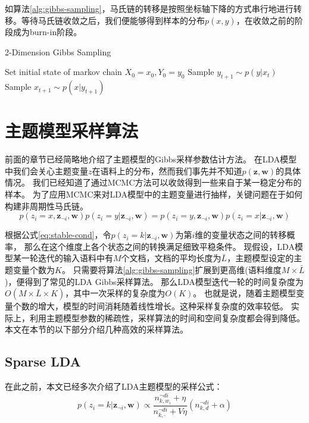 如算法\ref{alg:gibbs-sampling}，马氏链的转移是按照坐标轴下降的方式串行地进行转移。等待马氏链收敛之后，我们便能够得到样本的分布$p(x,y)$，在收敛之前的阶段成为burn-in阶段。

\begin{algorithm}[htb]  
\caption{2-Dimension Gibbs Sampling}
\label{alg:gibbs-sampling}
\begin{algorithmic}[1] 
\State Set initial state of markov chain $X_0 = x_0, Y_0 = y_0$
\State Sample $y_{t+1} \sim p(y | x_t)$
\State Sample $x_{t+1} \sim p(x | y_{t+1})$
\EndFor
\end{algorithmic}  
\end{algorithm}  

\section{主题模型采样算法}
前面的章节已经简略地介绍了主题模型的Gibbs采样参数估计方法。
在LDA模型中我们会关心主题变量$z$在语料上的分布，然而我们事先并不知道$p\mathbf{ (z, w)}$的具体情况。
我们已经知道了通过MCMC方法可以收敛得到一些来自于某一稳定分布的样本。
为了应用MCMC来对LDA模型中的主题变量进行抽样，关键问题在于如何构建非周期性马氏链。
\begin{equation}
\label{eq:stable-cond}
p(z_i = x , \mathbf{z}_{\neg i}, \mathbf{w}) p( z_i = y | \mathbf{z}_{\neg i},  \mathbf{w})  =  
p(z_i = y , \mathbf{z}_{\neg i}, \mathbf{w}) p( z_i = x | \mathbf{z}_{\neg i},  \mathbf{w}) 
\end{equation}

根据公式\ref{eq:stable-cond}，令$p( z_i = k | \mathbf{z}_{\neg i},  \mathbf{w})$为第$i$维的变量状态之间的转移概率，
那么在这个维度上各个状态之间的转换满足细致平稳条件。
现假设，LDA模型某一轮迭代的输入语料中有$M$个文档，文档的平均长度为$\bar{L}$，主题模型设定的主题变量个数为$K$。
只需要将算法\ref{alg:gibbs-sampling}扩展到更高维(语料维度$M \times \bar{L}$)，便得到了常见的LDA Gibbs采样算法。
那么LDA模型迭代一轮的时间复杂度为$O(M\times \bar{L} \times K)$，其中一次采样的复杂度为$O(K)$。
也就是说，随着主题模型变量个数的增大，模型的时间消耗随着线性增长。这种采样复杂度的效率较低。
实际上，利用主题模型参数的稀疏性，采样算法的时间和空间复杂度都会得到降低。
本文在本节的以下部分介绍几种高效的采样算法。

\subsection{Sparse LDA}
在此之前，本文已经多次介绍了LDA主题模型的采样公式：
\begin{equation}
\label{eq:sample-prob}
p( z_i = k | \mathbf{z}_{\neg i},  \mathbf{w}) 
	\propto  \dfrac{ n_{k, w_i}^{\neg di} + \eta }{ n_{k, \cdot}^{\neg di} + V\eta}(n_{k,d}^{\neg di} + \alpha)
\end{equation}

